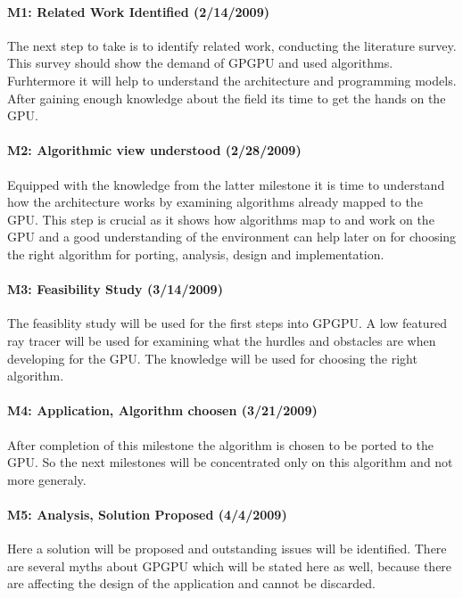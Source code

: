 \paragraph{M1: Related Work Identified (2/14/2009)} %
\label{par:m1_related_work_identified}
The next step to take is to identify related work, conducting the literature 
survey. This survey should show the demand of GPGPU and used algorithms. 
Furhtermore it will help to understand the architecture and programming models. 
After gaining enough knowledge about the field its time to get the hands on the 
GPU.
\paragraph{M2: Algorithmic view understood (2/28/2009)} %
\label{par:m2_architecture_algorithmic_view_understood}
Equipped with the knowledge from the latter milestone it is time to understand
how the architecture works by examining algorithms already mapped to the GPU.
This step is crucial as it shows how algorithms map to and work on the \gls{GPU}
and a good understanding of the environment can help later on for choosing the
right algorithm for porting, analysis, design and implementation.
\paragraph{M3: Feasibility Study (3/14/2009)} %
\label{par:m3_feasibility_study}
The feasiblity study will be used for the first steps into GPGPU. A low featured
ray tracer will be used for examining what the hurdles and obstacles are when 
developing for the GPU. The knowledge will be used for choosing the right 
algorithm. 
\paragraph{M4: Application, Algorithm choosen (3/21/2009)} %
\label{par:m4_application_algorithm_choosen}
After completion of this milestone the algorithm is chosen to be ported to the 
GPU. So the next milestones will be concentrated only on this algorithm and not 
more generaly. 
\paragraph{M5: Analysis, Solution Proposed (4/4/2009)} %
\label{par:m5_analysis_solution_proposed}
Here a solution will be proposed and outstanding issues will be identified. 
There are several myths about GPGPU which will be stated here as well, because 
there are affecting the design of the application and cannot be discarded.
